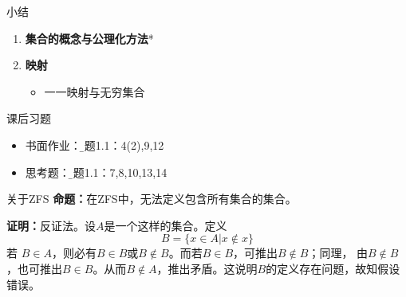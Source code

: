 \begin{frame}[<+->]{小结}
	\linespread{1.5}
	\begin{enumerate}
	  \item {\bf 集合的概念与公理化方法}*
	  \item {\bf 映射}
	  \begin{itemize}
	    \item 一一映射与无穷集合
	  \end{itemize}
	\end{enumerate}
	\pause
	\pause
	\begin{exampleblock}{课后习题}
	  \begin{itemize}
	    \item 书面作业：{\b 习题1.1：4(2),9,12}
	    \item 思考题：{\b 习题1.1：7,8,10,13,14}
	  \end{itemize}
	\end{exampleblock}
\end{frame}


\begin{frame}{关于ZFS}
	\linespread{1.4}
	{\bf 命题：}在ZFS中，无法定义包含所有集合的集合。
	
	{\bf 证明：}反证法。设$A$是一个这样的集合。定义
	$$B=\{x\in A|x\notin x\}$$
	若
	$B\in A$，则必有$B\in B$或$B\notin B$。而若$B\in B$，可推出$B\notin B$；同理，
	由$B\notin B$，也可推出$B\in B$。从而$B\notin A$，推出矛盾。这说明$B$的定义存在问题，故知假设错误。
\end{frame}